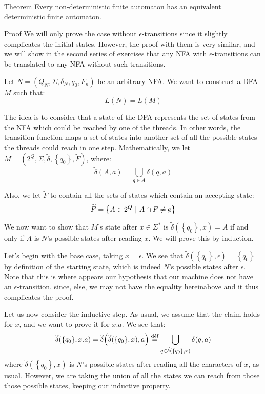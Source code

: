\documentclass[a4paper]{article}
\begin{document}
\begin{parag}{Theorem}
    Every non-deterministic finite automaton has an equivalent deterministic finite automaton.

    \begin{subparag}{Proof}
        We will only prove the case without $\epsilon$-transitions since it slightly complicates the initial states. However, the proof with them is very similar, and we will show in the second series of exercises that any NFA with $\epsilon$-transitions can be translated to any NFA without such transitions.

        Let $N = \left(Q_N, \Sigma, \delta_N, q_0, F_n\right)$ be an arbitrary NFA. We want to construct a DFA $M$ such that: 
        \[L\left(N\right) = L\left(M\right)\]
        
        The idea is to consider that a state of the DFA represents the set of states from the NFA which could be reached by one of the threads. In other words, the transition function maps a set of states into another set of all the possible states the threads could reach in one step. Mathematically, we let $M = \left(2^Q, \Sigma, \widetilde{\delta}, \left\{q_0\right\}, \widetilde{F}\right)$, where: 
        \[\widetilde{\delta}\left(A, a\right) = \bigcup_{q \in A} \delta\left(q, a\right)\]


        Also, we let $\widetilde{F}$ to contain all the sets of states which contain an accepting state: 
        \[\widetilde{F} = \left\{A \in 2^Q \suchthat A \cap F \neq \o\right\}\]
        
        We now want to show that $M$'s state after $x \in \Sigma^*$ is $\widetilde{\delta}\left(\left\{q_0\right\}, x\right) = A$ if and only if $A$ is $N$'s possible states after reading $x$. We will prove this by induction.

        Let's begin with the base case, taking $x = \epsilon$. We see that $\widetilde{\delta}\left(\left\{q_0\right\}, \epsilon\right) = \left\{q_0\right\}$ by definition of the starting state, which is indeed $N$'s possible states after $\epsilon$. Note that this is where appears our hypothesis that our machine does not have an $\epsilon$-transition, since, else, we may not have the equality hereinabove and it thus complicates the proof. 

        Let us now consider the inductive step. As usual, we assume that the claim holds for $x$, and we want to prove it for $x.a$. We see that: 
        \[\widetilde{\delta}\left(\left\{q_0\right\}, x.a\right) = \widetilde{\delta}\left(\widetilde{\delta}\left(\left\{q_0\right\}, x\right), a\right) \over{=}{\text{déf}} \bigcup_{q \in \widetilde{\delta}\left(\left\{q_0\right\}, x\right)} \delta\left(q, a\right) \]
        where $\widetilde{\delta}\left(\left\{q_0\right\}, x\right)$ is $N$'s possible states after reading all the characters of $x$, as usual. However, we are taking the union of all the states we can reach from those those possible states, keeping our inductive property.
        

\end{subparag}
\end{parag}
\end{document}
